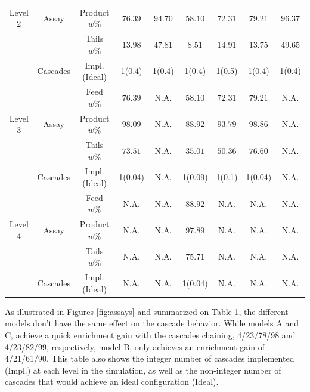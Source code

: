 \begin{table}[h!]
{\begin{tabular*}{\linewidth}{c @{\extracolsep{\fill}} cccccccc}
Level 2 & Assay      & Product $w\%$  & $76.39$  & $94.70$  & $58.10$  & $72.31$  & $79.21$  & $96.37$ \\
        &            & Tails $w\%$    & $13.98$  & $47.81$  & $8.51$   & $14.91$  & $13.75$  & $49.65$ \\
        & Cascades   & Impl. (Ideal)  & 1(0.4)   & 1(0.4)   & 1(0.4)   & 1(0.5)   & 1(0.4)   & 1(0.4)   \\
\midrule                                                                                                 
        &            & Feed $w\%$     & $76.39$  & N.A.     & $58.10$  & $72.31$  & $79.21$  & N.A.      \\
Level 3 & Assay      & Product $w\%$  & $98.09$  & N.A.     & $88.92$  & $93.79$  & $98.86$  & N.A.      \\
        &            & Tails $w\%$    & $73.51$  & N.A.     & $35.01$  & $50.36$  & $76.60$  & N.A.      \\
        & Cascades   & Impl. (Ideal)  & 1(0.04)  & N.A.     & 1(0.09)  & 1(0.1)   & 1(0.04)  & N.A.      \\
\midrule                                                                                                 
        &            & Feed $w\%$     & N.A.     & N.A.     & $88.92$  & N.A.     & N.A.     & N.A.      \\
Level 4 & Assay      & Product $w\%$  & N.A.     & N.A.     & $97.89$  & N.A.     & N.A.     & N.A.      \\
        &            & Tails $w\%$    & N.A.     & N.A.     & $75.71$  & N.A.     & N.A.     & N.A.      \\
        & Cascades   & Impl. (Ideal)  & N.A.     & N.A.     & 1(0.04)  & N.A.     & N.A.     & N.A.      \\
\bottomrule
\end{tabular*}
}
\label{tab:level}
\end{table}

As illustrated in Figures \ref{fig:assays} and summarized on Table
\ref{tab:level}, the different models don't have the same effect on the
cascade behavior. While models A and C, achieve a quick enrichment gain with
the cascades chaining, 4/23/78/98 and 4/23/82/99, respectively, model B, only
achieves an enrichment gain of 4/21/61/90.  This table also shows the integer
number of cascades implemented (Impl.) at each level in the simulation, as well as the
non-integer number of cascades that would achieve an ideal configuration (Ideal).


